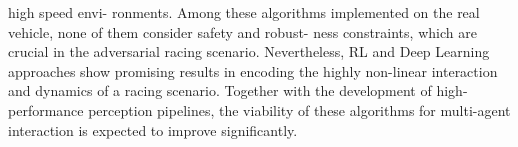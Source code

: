 high speed envi- ronments. Among these algorithms implemented on the real vehicle, none of them consider safety and robust- ness constraints, which are crucial in the adversarial racing scenario. Nevertheless, RL and Deep Learning approaches show promising results in encoding the highly non-linear interaction and dynamics of a racing scenario. Together with the development of high-performance perception pipelines, the viability of these algorithms for multi-agent interaction is expected to improve significantly.
\cite{johan22}


\cite{deepLearning19}